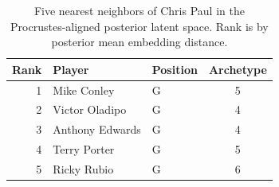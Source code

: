 \begin{table}[htbp]
  \centering\small
  \begin{tabular}{rllc}
    \toprule
    Rank & Player & Position & Archetype \\
    \midrule
    1 & Mike Conley & G & 5 \\
    2 & Victor Oladipo & G & 4 \\
    3 & Anthony Edwards & G & 4 \\
    4 & Terry Porter & G & 5 \\
    5 & Ricky Rubio & G & 6 \\
    \bottomrule
  \end{tabular}
  \caption{Five nearest neighbors of Chris Paul in the Procrustes-aligned posterior latent space. Rank is by posterior mean embedding distance.}
  \label{tab:Chris_Paul_neighbors}
\end{table}

